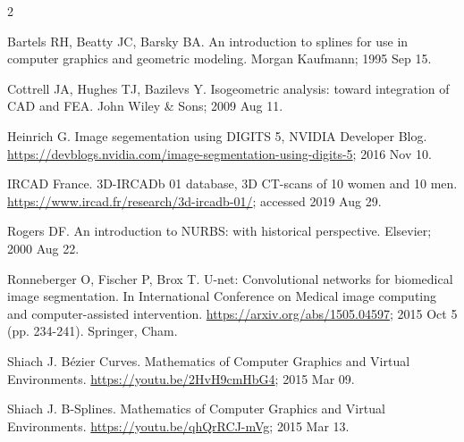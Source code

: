 
\begin{thebibliography}{2}

 Bartels RH, Beatty JC, Barsky BA. An introduction to splines for use in computer graphics and geometric modeling. Morgan Kaufmann; 1995 Sep 15.

 Cottrell JA, Hughes TJ, Bazilevs Y. Isogeometric analysis: toward integration of CAD and FEA. John Wiley \& Sons; 2009 Aug 11.

 Heinrich G.  Image segementation using DIGITS 5, NVIDIA Developer Blog.  \url{https://devblogs.nvidia.com/image-segmentation-using-digits-5}; 2016 Nov 10.

IRCAD France.  3D-IRCADb 01 database, 3D CT-scans of 10 women and 10 men. \url{https://www.ircad.fr/research/3d-ircadb-01/}; accessed 2019 Aug 29.

 Rogers DF. An introduction to NURBS: with historical perspective. Elsevier; 2000 Aug 22.

 Ronneberger O, Fischer P, Brox T. U-net: Convolutional networks for biomedical image segmentation. In International Conference on Medical image computing and computer-assisted intervention. \url{https://arxiv.org/abs/1505.04597}; 2015 Oct 5 (pp. 234-241). Springer, Cham.

 Shiach J. B\'ezier Curves.  Mathematics of Computer Graphics and Virtual Environments.  \url{https://youtu.be/2HvH9cmHbG4}; 2015 Mar 09.

 Shiach J. B-Splines.  Mathematics of Computer Graphics and Virtual Environments.  \url{https://youtu.be/qhQrRCJ-mVg}; 2015 Mar 13.

\end{thebibliography}

